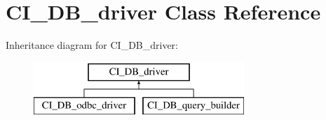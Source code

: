 \hypertarget{class_c_i___d_b__driver}{}\section{C\+I\+\_\+\+D\+B\+\_\+driver Class Reference}
\label{class_c_i___d_b__driver}
Inheritance diagram for C\+I\+\_\+\+D\+B\+\_\+driver\+:\begin{figure}[H]
\begin{center}
\leavevmode
\includegraphics[height=2.000000cm]{class_c_i___d_b__driver}
\end{center}
\end{figure}

